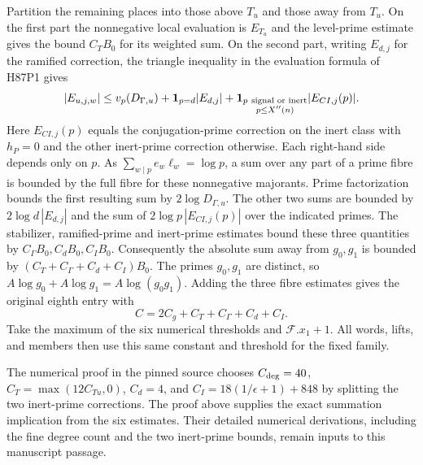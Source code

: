 Partition the remaining places into those above $T_u$ and those
away from $T_u$. On the first part the nonnegative local evaluation
is $E_{T_u}$ and the level-prime estimate gives the bound $C_TB_0$
for its weighted sum. On the second part, writing $E_{d,j}$ for
the ramified correction, the triangle inequality in the evaluation
formula of H87P1 gives
\[
 |E_{u,j,w}|\le v_p(D_{\Gamma,u})
 +{\bf1}_{p=d}|E_{d,j}|
 +{\bf1}_{\substack{p\ \text{signal or inert}\\p\le X''(n)}}
                      |E_{CI,j}(p)|.
\]
Here $E_{CI,j}(p)$ equals the conjugation-prime correction on the
inert class with $h_P=0$ and the other inert-prime correction
otherwise. Each right-hand side depends only on $p$. As
$\sum_{w\mid p}e_w\ell_w=\log p$, a sum over any part of a
prime fibre is bounded by the full fibre for these nonnegative
majorants. Prime factorization bounds the first resulting sum by
$2\log D_{\Gamma,u}$. The other two sums are bounded by
$2\log d\,|E_{d,j}|$ and the sum of
$2\log p\,|E_{CI,j}(p)|$ over the indicated primes.
The stabilizer, ramified-prime and inert-prime estimates bound
these three quantities by $C_\Gamma B_0,C_d B_0,C_I B_0$.
Consequently the absolute sum away from $g_0,g_1$ is bounded
by $(C_T+C_\Gamma+C_d+C_I)B_0$. The primes $g_0,g_1$ are
distinct, so $A\log g_0+A\log g_1=A\log(g_0g_1)$. Adding the
three fibre estimates gives the original eighth entry with
\[
                       C=2C_g+C_T+C_\Gamma+C_d+C_I .
\]
Take the maximum of the six numerical thresholds and
$\mathcal F.x_1+1$. All words, lifts, and members then use this
same constant and threshold for the fixed family.

The numerical proof in the pinned source chooses $C_{\rm deg}=40$,
$C_T=\max(12C_{Tu},0)$, $C_d=4$, and
$C_I=18(1/\epsilon+1)+848$ by splitting the two
inert-prime corrections. The proof above supplies the exact
summation implication from the six estimates. Their detailed
numerical derivations, including the fine degree count and the two
inert-prime bounds, remain inputs to this manuscript passage.
